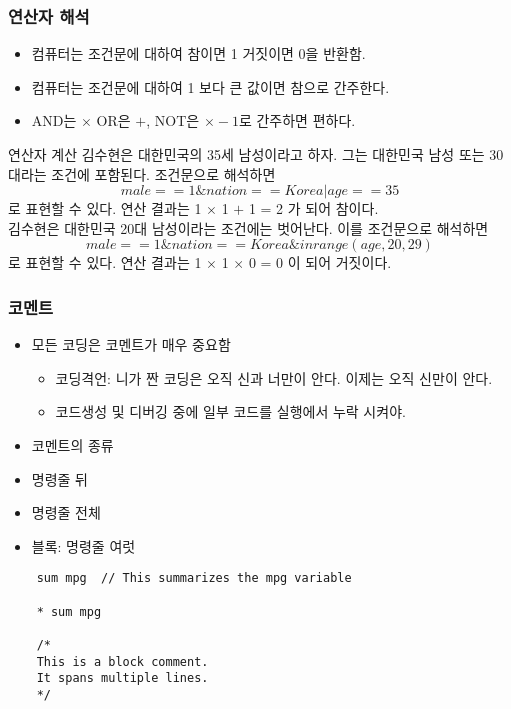 \documentclass[aspectratio=169,xcolor=dvipsnames,handout]{beamer}
\begin{document}
\begin{frame}
    \frametitle{연산자 해석}
    \begin{itemize}[<+->]
        \item 컴퓨터는 조건문에 대하여 참이면 1 거짓이면 0을 반환함.
        \item 컴퓨터는 조건문에 대하여 1 보다 큰 값이면 참으로 간주한다.
        \item AND는 $\times$ OR은 $+$, NOT은 $\times -1$로 간주하면 편하다.
    \end{itemize}
    \begin{exampleblock}{연산자 계산}
        김수현은 대한민국의 35세 남성이라고 하자. 그는 대한민국 남성 또는 30대라는 조건에 포함된다. 조건문으로 해석하면 \[
            male == 1 \& nation == Korea | age == 35
        \]로 표현할 수 있다. 연산 결과는 1 $\times$ 1 $+$ 1 = 2 가 되어 참이다.\\
        김수현은 대한민국 20대 남성이라는 조건에는 벗어난다. 이를 조건문으로 해석하면 \[
            male == 1 \& nation == Korea \& inrange(age, 20, 29)
        \]로 표현할 수 있다. 연산 결과는 1 $\times$ 1 $\times$ 0 = 0 이 되어 거짓이다.
    \end{exampleblock}
\end{frame}

\begin{frame}
    \frametitle{코멘트}
    \begin{itemize}[<+->]
        \item 모든 코딩은 코멘트가 매우 중요함
        \begin{itemize}[<+->]
            \item 코딩격언: 니가 짠 코딩은 오직 신과 너만이 안다. 이제는 오직 신만이 안다.
            \item 코드생성 및 디버깅 중에 일부 코드를 실행에서 누락 시켜야.
        \end{itemize}
    \item 코멘트의 종류
        \item 명령줄 뒤
        \item 명령줄 전체
        \item 블록: 명령줄 여럿
    \end{itemize}
    \begin{verbatim}
    sum mpg  // This summarizes the mpg variable

    * sum mpg

    /* 
    This is a block comment.
    It spans multiple lines.
    */
    \end{verbatim}
\end{frame}
\end{document}
